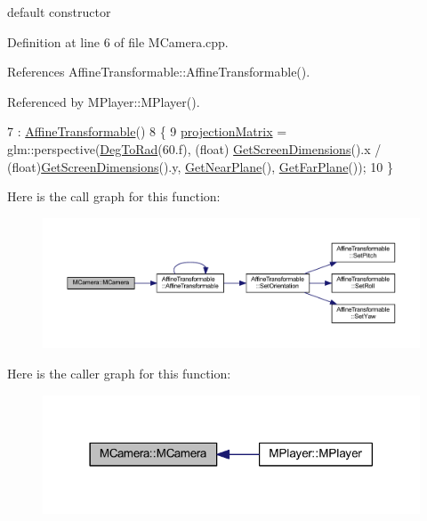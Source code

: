 default constructor 



Definition at line 6 of file M\+Camera.\+cpp.



References Affine\+Transformable\+::\+Affine\+Transformable().



Referenced by M\+Player\+::\+M\+Player().


\begin{DoxyCode}
7   : \hyperlink{class_affine_transformable_a54fbbe0cdde13ea581dce04ec0de8545}{AffineTransformable}()
8 \{
9     \hyperlink{class_m_camera_af2adbeea14ebcd69bbe03df1e8c33d3c}{projectionMatrix} = glm::perspective(\hyperlink{_m_math_8h_a12596bd7bfb634efa54d7493e6d546a8}{DegToRad}(60.f), (\textcolor{keywordtype}{float})
      \hyperlink{_screen_8h_a30da0e5a5d6ee95789dc562a4f495ba9}{GetScreenDimensions}().x / (\textcolor{keywordtype}{float})\hyperlink{_screen_8h_a30da0e5a5d6ee95789dc562a4f495ba9}{GetScreenDimensions}().y, 
      \hyperlink{_screen_8h_af8bd0635dd9eef489bf168f6ac4e0445}{GetNearPlane}(), \hyperlink{_screen_8h_a0963b4d3d55139b9053ec5abc0d9030e}{GetFarPlane}());
10 \}
\end{DoxyCode}


Here is the call graph for this function\+:\nopagebreak
\begin{figure}[H]
\begin{center}
\leavevmode
\includegraphics[width=350pt]{class_m_camera_aeb31dba292ce873c389d6082f9bd38e6_cgraph}
\end{center}
\end{figure}




Here is the caller graph for this function\+:\nopagebreak
\begin{figure}[H]
\begin{center}
\leavevmode
\includegraphics[width=318pt]{class_m_camera_aeb31dba292ce873c389d6082f9bd38e6_icgraph}
\end{center}
\end{figure}


